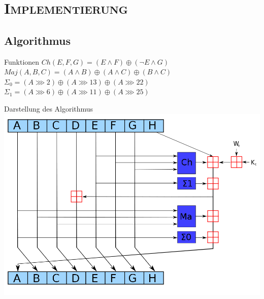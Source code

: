 \documentclass[xcolor=x11names,compress]{beamer}
\renewcommand{\(}{\begin{columns}}
\renewcommand{\)}{\end{columns}}
\newcommand{\<}[1]{\begin{column}{#1}}
\renewcommand{\>}{\end{column}}
\begin{document}
\section{\scshape Implementierung}
\subsection{Algorithmus}
\begin{frame}{Funktionen}
$ Ch(E,F,G) = (E\wedge F) \oplus (\neg E\wedge G)$
$ Maj(A,B,C) = (A\wedge B) \oplus (A\wedge C) \oplus (B\wedge C)$\\
$ \Sigma_0 = (A\ggg 2) \oplus (A\ggg 13) \oplus (A\ggg 22) $\\
$ \Sigma_1 = (A\ggg 6) \oplus (A\ggg 11) \oplus (A\ggg 25) $\\
\end{frame}


\begin{frame}{Darstellung des Algorithmus}
\includegraphics[scale=0.3]{sha256.png}\\
\end{frame}


\end{document}
